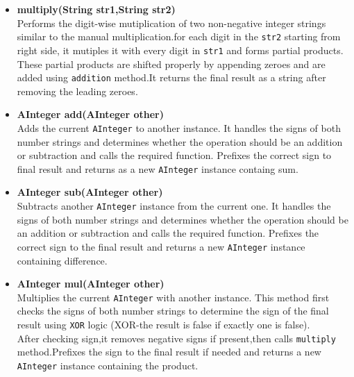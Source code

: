 \documentclass{article}
\begin{document}
\begin{itemize}
    \item \textbf{multiply(String str1,String str2)} \\
    Performs the digit-wise mutiplication of two non-negative integer strings similar to the manual multiplication.for each digit in the \texttt{str2} starting from right side, it mutiples it with every digit in \texttt{str1} and forms partial products.\\
    These partial products are shifted properly by appending zeroes and are added using \texttt{addition} method.It returns the final result as a string after removing the leading zeroes.

    
    \item \textbf{AInteger add(AInteger other)} \\
    Adds the current \texttt{AInteger} to another instance. It handles the signs of both number strings and determines whether the operation should be an addition or subtraction and calls the required function. Prefixes the correct sign to final result and returns as a new \texttt{AInteger} instance containg sum.

    \item \textbf{AInteger sub(AInteger other)} \\
    Subtracts another \texttt{AInteger} instance from the current one. It handles the signs of both number strings and determines whether the operation should be an addition or subtraction and calls the required function. Prefixes the correct sign to the final result and returns a new \texttt{AInteger} instance containing difference.


    \item \textbf{AInteger mul(AInteger other)} \\
    Multiplies the current \texttt{AInteger} with another instance. This method first checks the signs of both number strings to determine the sign of the final result using \texttt{XOR} logic (XOR-the result is false if exactly one is false). \\
    After checking sign,it removes negative signs if present,then calls \texttt{multiply} method.Prefixes the sign to the final result if needed and returns a new \texttt{AInteger} instance containing the product.


\end{itemize}
\end{document}
